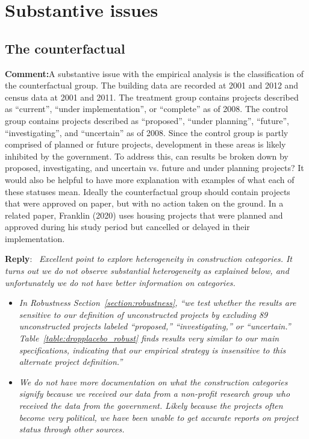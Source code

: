 \documentclass{article}
\newcounter{reviewer}
\newcounter{point}[reviewer]
\newcommand{\reply}{\medskip \noindent \textbf{Reply}:\ \textit }
\newcommand{\sr}{\begin{minipage}{\dimexpr\textwidth-3cm}}
\newcommand{\er}{\end{minipage}}
\newcommand{\cc}{\medskip \noindent \textbf{Comment:}\hspace{2em}}
\begin{document}
\section{Substantive issues}

\subsection{The counterfactual}

\cc A substantive issue with the empirical analysis is the classification of the counterfactual group. The building data are recorded at 2001 and 2012 and census data at 2001 and 2011. The treatment group contains projects described as ``current'', ``under implementation'', or ``complete'' as of 2008. The control group contains projects described as ``proposed'', ``under planning'', ``future'', ``investigating'', and ``uncertain'' as of 2008. Since the control group is partly comprised of planned or future projects, development in these areas is likely inhibited by the government. To address this, can results be broken down by proposed, investigating, and uncertain vs. future and under planning projects? It would also be helpful to have more explanation with examples of what each of these statuses mean. Ideally the counterfactual group should contain projects that were approved on paper, but with no action taken on the ground. In a related paper, Franklin (2020) uses housing projects that were planned and approved during his study period but cancelled or delayed in their implementation.

\sr
\reply{ Excellent point to explore heterogeneity in construction categories. It turns out we do not observe substantial heterogeneity as explained below, and unfortunately we do not have better information on categories.  }
\begin{itemize}
    \item \textit{ In Robustness Section~\ref{section:robustness}, ``we test whether the results are sensitive to our definition of unconstructed projects by excluding 89 unconstructed projects labeled ``proposed,'' ``investigating,'' or ``uncertain.'' Table~\ref{table:dropplacebo_robust} finds results very similar to our main specifications, indicating that our empirical strategy is insensitive to this alternate project definition.'' }
    \item \textit{We do not have more documentation on what the construction categories signify because we received our data from a non-profit research group who received the data from the government.  Likely because the projects often become very political, we have been unable to get accurate reports on project status through other sources. }
\end{itemize}  
\er\\
\end{document}
